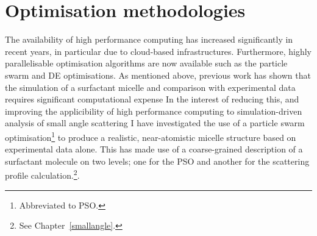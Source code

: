 \section{Optimisation methodologies}
The availability of high performance computing has increased significantly in recent years, in particular due to cloud-based infrastructures.
Furthermore, highly parallelisable optimisation algorithms are now available such as the particle swarm\autocite{kennedy_particle_1995,shi_modified_1998} and DE\autocite{storn_differential_1997} optimisations.
As mentioned above, previous work has shown that the simulation of a surfactant micelle and comparison with experimental data requires significant computational expense\autocite{hargreaves_atomistic_2011,ivanovic_temperature-dependent_2018}
In the interest of reducing this, and improving the applicibility of high performance computing to simulation-driven analysis of small angle scattering I have investigated the use of a particle swarm optimisation\footnote{Abbreviated to PSO.} to produce a realistic, near-atomistic micelle structure based on experimental data alone.
This has made use of a coarse-grained description of a surfactant molecule on two levels; one for the PSO and another for the scattering profile calculation.\footnote{See Chapter~\ref{smallangle}.}.

